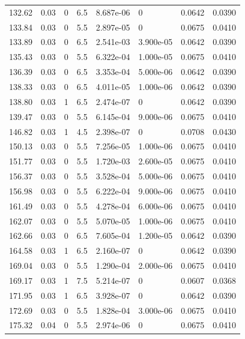 \documentclass[preview]{standalone}
\begin{document}
{{{\begin{tabular}{L{1.2cm}C{1.2cm} C{0.3cm}C{0.5cm} C{1.4cm}C{1.4cm} C{1.4cm}C{1.4cm}}
  132.62  &  0.03  & 0     & 6.5 &  8.687e-06  & 0  & 0.0642 &  0.0390   \\ 
  133.84  &  0.03  & 0     & 5.5 &  2.897e-05  & 0  & 0.0675 &  0.0410   \\ 
  133.89  &  0.03  & 0     & 6.5 &  2.541e-03  & 3.900e-05  & 0.0642 &  0.0390   \\ 
  135.43  &  0.03  & 0     & 5.5 &  6.322e-04  & 1.000e-05  & 0.0675 &  0.0410   \\ 
  136.39  &  0.03  & 0     & 6.5 &  3.353e-04  & 5.000e-06  & 0.0642 &  0.0390   \\ 
  138.33  &  0.03  & 0     & 6.5 &  4.011e-05  & 1.000e-06  & 0.0642 &  0.0390   \\ 
  138.80  &  0.03  & 1     & 6.5 &  2.474e-07  & 0  & 0.0642 &  0.0390   \\ 
  139.47  &  0.03  & 0     & 5.5 &  6.145e-04  & 9.000e-06  & 0.0675 &  0.0410   \\ 
  146.82  &  0.03  & 1     & 4.5 &  2.398e-07  & 0  & 0.0708 &  0.0430   \\ 
  150.13  &  0.03  & 0     & 5.5 &  7.256e-05  & 1.000e-06  & 0.0675 &  0.0410   \\ 
  151.77  &  0.03  & 0     & 5.5 &  1.720e-03  & 2.600e-05  & 0.0675 &  0.0410   \\ 
  156.37  &  0.03  & 0     & 5.5 &  3.528e-04  & 5.000e-06  & 0.0675 &  0.0410   \\ 
  156.98  &  0.03  & 0     & 5.5 &  6.222e-04  & 9.000e-06  & 0.0675 &  0.0410   \\ 
  161.49  &  0.03  & 0     & 5.5 &  4.278e-04  & 6.000e-06  & 0.0675 &  0.0410   \\ 
  162.07  &  0.03  & 0     & 5.5 &  5.070e-05  & 1.000e-06  & 0.0675 &  0.0410   \\ 
  162.66  &  0.03  & 0     & 6.5 &  7.605e-04  & 1.200e-05  & 0.0642 &  0.0390   \\ 
  164.58  &  0.03  & 1     & 6.5 &  2.160e-07  & 0  & 0.0642 &  0.0390   \\ 
  169.04  &  0.03  & 0     & 5.5 &  1.290e-04  & 2.000e-06  & 0.0675 &  0.0410   \\ 
  169.17  &  0.03  & 1     & 7.5 &  5.214e-07  & 0  & 0.0607 &  0.0368   \\ 
  171.95  &  0.03  & 1     & 6.5 &  3.928e-07  & 0  & 0.0642 &  0.0390   \\ 
  172.69  &  0.03  & 0     & 5.5 &  1.828e-04  & 3.000e-06  & 0.0675 &  0.0410   \\ 
  175.32  &  0.04  & 0     & 5.5 &  2.974e-06  & 0  & 0.0675 &  0.0410   \\ 

\end{tabular}}}}
\end{document}
